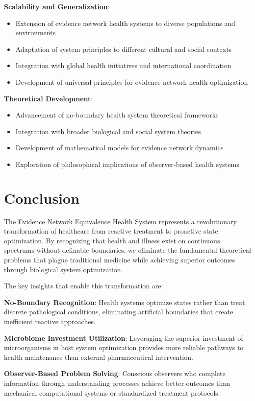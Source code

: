 \documentclass[12pt,a4paper]{article}
\begin{document}
\textbf{Scalability and Generalization}:
\begin{itemize}
\item Extension of evidence network health systems to diverse populations and environments
\item Adaptation of system principles to different cultural and social contexts
\item Integration with global health initiatives and international coordination
\item Development of universal principles for evidence network health optimization
\end{itemize}

\textbf{Theoretical Development}:
\begin{itemize}
\item Advancement of no-boundary health system theoretical frameworks
\item Integration with broader biological and social system theories
\item Development of mathematical models for evidence network dynamics
\item Exploration of philosophical implications of observer-based health systems
\end{itemize}

\section{Conclusion}

The Evidence Network Equivalence Health System represents a revolutionary transformation of healthcare from reactive treatment to proactive state optimization. By recognizing that health and illness exist on continuous spectrums without definable boundaries, we eliminate the fundamental theoretical problems that plague traditional medicine while achieving superior outcomes through biological system optimization.

The key insights that enable this transformation are:

\textbf{No-Boundary Recognition}: Health systems optimize states rather than treat discrete pathological conditions, eliminating artificial boundaries that create inefficient reactive approaches.

\textbf{Microbiome Investment Utilization}: Leveraging the superior investment of microorganisms in host system optimization provides more reliable pathways to health maintenance than external pharmaceutical intervention.

\textbf{Observer-Based Problem Solving}: Conscious observers who complete information through understanding processes achieve better outcomes than mechanical computational systems or standardized treatment protocols.
\end{document}

